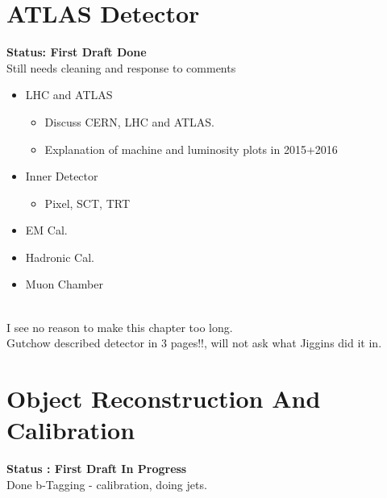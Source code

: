 \section{ATLAS Detector}

\textbf{Status: First Draft Done}\\
\noindent
Still needs cleaning and response to comments

\begin{itemize}
\item{LHC and ATLAS}
  \begin{itemize}[label={$-$}]
  \item{Discuss CERN, LHC and ATLAS.}
  \item{Explanation of machine and luminosity plots in 2015+2016}
  \end{itemize}

\item{Inner Detector}
  \begin{itemize}[label={$-$}]
  \item{Pixel, SCT, TRT}
  \end{itemize}
\item{EM Cal.}
\item{Hadronic Cal.}
\item{Muon Chamber}  
\end{itemize}

\noindent
\\I see no reason to make this chapter too long.\\
Gutchow described detector in 3 pages!!, will not ask what Jiggins did it in.

\section{Object Reconstruction And Calibration}

\textbf{Status : First Draft In Progress}\\
\noindent
Done b-Tagging - calibration, doing jets.

